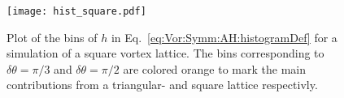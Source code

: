\begin{figure}[hb]
    \centering
    \texttt{[image: hist\_square.pdf]}
    \caption{Plot of the bins of $h$ in Eq.~\eqref{eq:Vor:Symm:AH:histogramDef} for a simulation of a square vortex lattice.
    The bins corresponding to $\delta\theta = \pi/3$ and $\delta\theta = \pi/2$ are colored orange to mark the main contributions from
    a triangular- and square lattice respectivly.}
    \label{fig:Vor:Symm:AH:histogram}
\end{figure}


